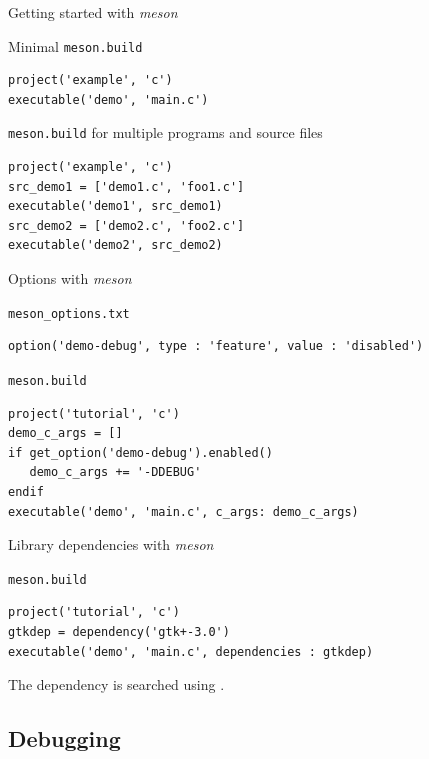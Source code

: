 \begin{frame}[fragile]{Getting started with {\em meson}}
  \begin{block}{Minimal {\tt meson.build}}
\begin{verbatim}
project('example', 'c')
executable('demo', 'main.c')
\end{verbatim}
  \end{block}

  \begin{block}{{\tt meson.build} for multiple programs and source files}
\begin{verbatim}
project('example', 'c')
src_demo1 = ['demo1.c', 'foo1.c']
executable('demo1', src_demo1)
src_demo2 = ['demo2.c', 'foo2.c']
executable('demo2', src_demo2)
\end{verbatim}
  \end{block}
\end{frame}

\begin{frame}[fragile]{Options with {\em meson}}
  \begin{block}{{\tt meson\_options.txt}}
\begin{verbatim}
option('demo-debug', type : 'feature', value : 'disabled')
\end{verbatim}
  \end{block}

  \begin{block}{{\tt meson.build}}
\begin{verbatim}
project('tutorial', 'c')
demo_c_args = []
if get_option('demo-debug').enabled()
   demo_c_args += '-DDEBUG'
endif
executable('demo', 'main.c', c_args: demo_c_args)
\end{verbatim}
  \end{block}
\end{frame}

\begin{frame}[fragile]{Library dependencies with {\em meson}}
  \begin{block}{{\tt meson.build}}
\begin{verbatim}
project('tutorial', 'c')
gtkdep = dependency('gtk+-3.0')
executable('demo', 'main.c', dependencies : gtkdep)
\end{verbatim}
  \end{block}

  The dependency  is searched using .
\end{frame}

\subsection{Debugging}


